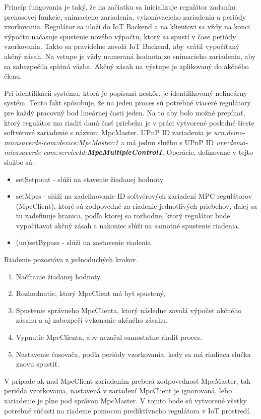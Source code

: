 Princíp fungovania je taký, že na začiatku sa inicializuje regulátor zadaním prenosovej funkcie, snímacieho zariadenia, vykonávacieho zariadenia a periódy vzorkovania. Regulátor sa uloží do IoT Backend a na klientovi sa vždy na konci výpočtu načasuje spustenie nového výpočtu, ktorý sa spustí v čase periódy vzorkovania. Takto sa pravidelne zavolá IoT Backend, aby vrátil vypočítaný akčný zásah. Na vstupe je vždy nameraná hodnota zo snímacieho zariadenia, aby sa zabezpečila spätná väzba. Akčný zásah na výstupe je aplikovaný do akčného členu.

\indent Pri identifikácii systému, ktorá je popísaná neskôr, je identifikovaný nelineárny systém. Tento fakt spôsobuje, že na jeden proces sú potrebné viaceré regulátory pre každý pracovný bod lineárnej časti jeden. Na to aby bolo možné prepínať, ktorý regulátor ma riadiť danú časť priebehu je v práci vytvorené posledné šieste softvérové zariadenie s názvom MpcMaster. UPnP ID zariadenia je \textit{urn:demo-micasaverde-com:device:MpcMaster:1} a má jednu službu s UPnP ID \textit{urn:demo-micasaverde-com:serviceId:\textbf{MpcMultipleControl1}}. Operácie, definované v tejto službe sú:
\begin{itemize}
\item setSetpoint - slúži na stavenie žiadanej hodnoty
\item setMpcs - slúži na zadefinovanie ID softvérových zariadení MPC regulátorov (MpcClient), ktoré sú zodpovedné za riadenie jednotlivých priebehov, ďalej sa tu zadefinuje hranica, podľa ktorej sa rozhodne, ktorý regulátor bude vypočítavať akčný zásah a nakoniec slúži na samotné spustenie riadenia.
\item (un)setBypass - slúži na zastavenie riadenia.
\end{itemize}
Riadenie pozostáva z jednoduchých krokov.
\begin{enumerate}
\item Načítanie žiadanej hodnoty.
\item Rozhodnutie, ktorý MpcClient má byť spustený, 
\item Spustenie správneho MpcClienta, ktorý následne zavolá výpočet akčného zásahu a aj zabezpečí vykonanie akčného zásahu. 
\item Vypnutie MpcClienta, aby nezačal samostatne riadiť proces.
\item Nastavenie časovača, podľa periódy vzorkovania, kedy sa má  riadiaca slučka znovu spustiť.
\end{enumerate}
V prípade ak nad MpcClient zariadením preberá zodpovednosť MpcMaster, tak perióda vzorkovania, nastavená v zariadení MpcClient je ignorovaná, lebo zariadenie je plne pod správou MpcMaster. V tomto bode sú vytvorené všetky potrebné súčasti na riadenie pomocou prediktívneho regulátora v IoT prostredí.

